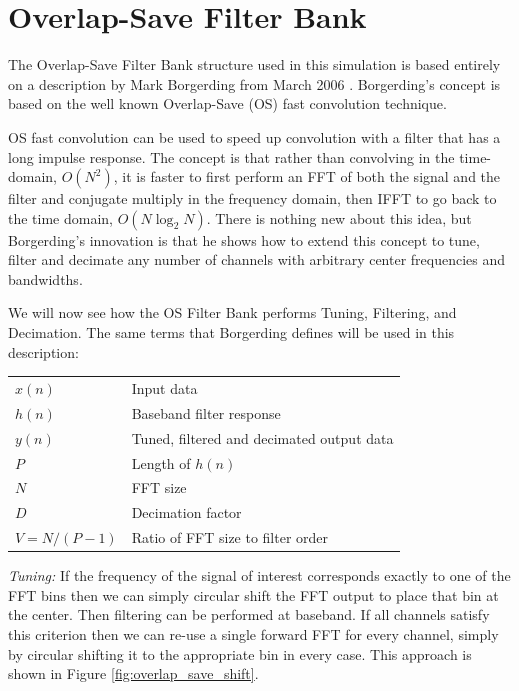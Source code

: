 \documentclass[12pt]{article}
\begin{document}
\section{Overlap-Save Filter Bank}
\label{sec:os_filter_bank}
The Overlap-Save Filter Bank structure used in this simulation is based
entirely on a description by Mark Borgerding from March 2006
\cite{Borgerding1}.  Borgerding's concept is based on the well known
Overlap-Save (OS) fast convolution technique.

OS fast convolution can be used to speed up convolution with
a filter that has a long impulse response. The concept is that rather than
convolving in the time-domain, $O(N^2)$, it is faster to first
perform an FFT of both the signal and the filter and conjugate multiply in the
frequency domain, then IFFT to go back to the time domain, $O(N\log_2N)$.
There is nothing new about this idea, but Borgerding's innovation is that he
shows how to extend this concept to tune, filter and decimate any number of
channels with arbitrary center frequencies and bandwidths.

We will now see how the OS Filter Bank performs Tuning, Filtering, and
Decimation. The same terms that Borgerding defines will be used in this
description:

\begin{center}
\begin{tabular}{ll}
    $x(n)$        & Input data \\
    $h(n)$        & Baseband filter response \\
    $y(n)$        & Tuned, filtered and decimated output data \\
    $P$           & Length of $h(n)$ \\
    $N$           & FFT size \\
    $D$           & Decimation factor \\
    $V = N/(P-1)$ & Ratio of FFT size to filter order \\
\end{tabular}
\end{center}

\emph{Tuning:} If the frequency of the signal of interest corresponds exactly
to one of the FFT bins then we can simply circular shift the FFT output to
place that bin at the center. Then filtering can be performed at baseband.  If
all channels satisfy this criterion then we can re-use a single forward FFT for
every channel, simply by circular shifting it to the appropriate bin in every
case.  This approach is shown in Figure \ref{fig:overlap_save_shift}.
\end{document}
